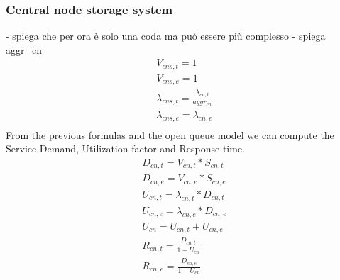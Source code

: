\documentclass[11pt]{article}
\begin{document}
\subsubsection{Central node storage system}
- spiega che per ora è solo una coda ma può essere più complesso
- spiega aggr\_cn
\begin{equation}
	\begin{array}{l}
		V_{cns, t} = 1 \\
		V_{cns, e} = 1 \\
		\lambda_{cns, t} = \frac{\lambda_{cn,t}}{aggr_{cn}} \\
		\lambda_{cns, e} = \lambda_{cn,e} \\
	\end{array}
\end{equation}
From the previous formulas and the open queue model we can compute the Service Demand, Utilization factor and Response time.
\begin{equation}
	\begin{array}{l}
		D_{cn, t} = V_{cn, t} * S_{cn, t} \\
		D_{cn, e} = V_{cn, e} * S_{cn, e} \\
		U_{cn, t} = \lambda_{cn, t} * D_{cn, t} \\
		U_{cn, e} = \lambda_{cn, e} * D_{cn, e} \\
		U_{cn} = U_{cn, t} + U_{cn, e} \\
		R_{cn, t} = \frac{D_{cn, t}}{1 - U_{cn}} \\
		R_{cn, e} = \frac{D_{cn, e}}{1 - U_{cn}} \\
	\end{array}
\end{equation}
\end{document}
